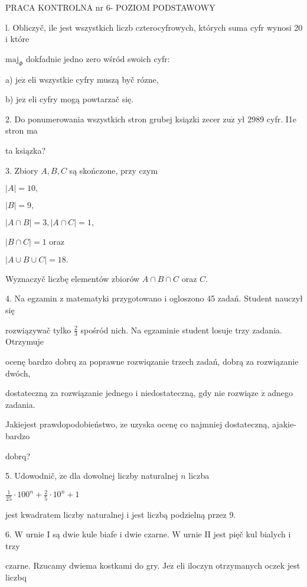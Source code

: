 \documentclass[a4paper,12pt]{article}
\begin{document}
PRACA KONTROLNA nr 6- POZIOM PODSTAWOWY

l. Obliczyč, ile jest wszystkich liczb czterocyfrowych, których suma cyfr wynosi 20 $\mathrm{i}$ które

$\mathrm{m}\mathrm{a}\mathrm{j}_{\Phi}$ dokfadnie jedno zero wśród swoich cyfr:

a) $\mathrm{j}\mathrm{e}\dot{\mathrm{z}}$ eli wszystkie cyfry muszą byč rózne,

b) $\mathrm{j}\mathrm{e}\dot{\mathrm{z}}$ eli cyfry mogą powtarzač się.

2. Do ponumerowania wszystkich stron grubej ksiązki zecer $\mathrm{z}\mathrm{u}\dot{\mathrm{z}}$ ył 2989 cyfr. I1e stron ma

ta ksiązka?

3. Zbiory $A, B, C$ są skończone, przy czym

$|A|=10,$

$|B|=9,$

$|A\cap B|=3, |A\cap C|=1,$

$|B\cap C|=1$ oraz

$|A\cup B\cup C|=18.$

Wyznaczyč liczbę elementów zbiorów $A\cap B\cap C$ oraz $C.$

4. Na egzamin $\mathrm{z}$ matematyki przygotowano $\mathrm{i}$ ogloszono 45 zadań. Student nauczył się

rozwiązywač tylko $\displaystyle \frac{2}{3}$ spośród nich. Na egzaminie student losuje trzy zadania. Otrzymuje

ocenę bardzo dobrq za poprawne rozwiqzanie trzech zadań, dobrą za rozwiązanie dwóch,

dostateczną za rozwiązanie jednego $\mathrm{i}$ niedostateczną, gdy nie rozwiąze $\dot{\mathrm{z}}$ adnego zadania.

Jakiejest prawdopodobieństwo, $\dot{\mathrm{z}}\mathrm{e}$ uzyska ocenę co najmniej dostateczną, ajakie- bardzo

dobrq?

5. Udowodnič, $\dot{\mathrm{z}}\mathrm{e}$ dla dowolnej liczby naturalnej $n$ liczba

$\displaystyle \frac{1}{25}\cdot 100^{n}+\frac{2}{5}\cdot 10^{n}+1$

jest kwadratem liczby naturalnej $\mathrm{i}$ jest liczbą podzielną przez 9.

6. $\mathrm{W}$ urnie I są dwie kule biafe $\mathrm{i}$ dwie czarne. $\mathrm{W}$ urnie II jest pięč kul bialych $\mathrm{i}$ trzy

czarne. Rzucamy dwiema kostkami do gry. $\mathrm{J}\mathrm{e}\dot{\mathrm{z}}$ eli iloczyn otrzymanych oczek jest liczbq
\end{document}

